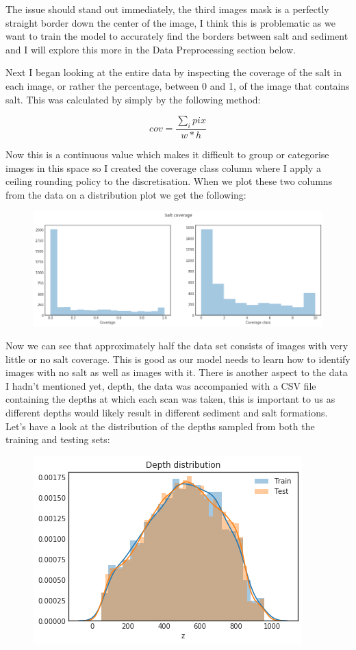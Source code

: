 \documentclass[11pt]{article}
\makeatletter
\def\maxwidth{\ifdim\Gin@nat@width>\linewidth\linewidth
    \else\Gin@nat@width\fi}
\let\Oldincludegraphics\includegraphics
\renewcommand{\includegraphics}[1]{\Oldincludegraphics[width=.8\maxwidth]{#1}}
\makeatother
\begin{document}
The issue should stand out immediately, the third images mask is a
perfectly straight border down the center of the image, I think this is
problematic as we want to train the model to accurately find the borders
between salt and sediment and I will explore this more in the Data
Preprocessing section below.

Next I began looking at the entire data by inspecting the coverage of
the salt in each image, or rather the percentage, between 0 and 1, of
the image that contains salt. This was calculated by simply by the
following method:

\[ cov = \frac{\sum_i pix}{w*h} \]

Now this is a continuous value which makes it difficult to group or
categorise images in this space so I created the coverage class column
where I apply a ceiling rounding policy to the discretisation. When we
plot these two columns from the data on a distribution plot we get the
following:

\begin{figure}
\centering
\includegraphics{pictures/coverage.png}
\caption{}
\end{figure}

Now we can see that approximately half the data set consists of images
with very little or no salt coverage. This is good as our model needs to
learn how to identify images with no salt as well as images with it.
There is another aspect to the data I hadn't mentioned yet, depth, the
data was accompanied with a CSV file containing the depths at which each
scan was taken, this is important to us as different depths would likely
result in different sediment and salt formations. Let's have a look at
the distribution of the depths sampled from both the training and
testing sets:

\begin{figure}
\centering
\includegraphics{pictures/depths.png}
\caption{}
\end{figure}
\end{document}
